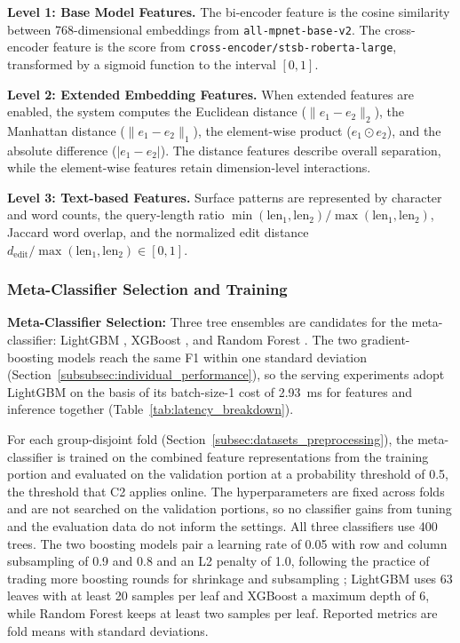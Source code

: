 \documentclass[authoryear,preprint,review,12pt]{elsarticle}
\begin{document}
\textbf{Level 1: Base Model Features.}
The bi-encoder feature is the cosine similarity between 768-dimensional embeddings from \texttt{all-mpnet-base-v2}. The cross-encoder feature is the score from \texttt{cross-encoder/stsb-roberta-large}, transformed by a sigmoid function to the interval $[0,1]$.

\textbf{Level 2: Extended Embedding Features.}
When extended features are enabled, the system computes the Euclidean distance ($\lVert e_1-e_2\rVert_2$), the Manhattan distance ($\lVert e_1-e_2\rVert_1$), the element-wise product ($e_1\odot e_2$), and the absolute difference ($|e_1-e_2|$). The distance features describe overall separation, while the element-wise features retain dimension-level interactions.

\textbf{Level 3: Text-based Features.}
Surface patterns are represented by character and word counts, the query-length ratio $\min(\mathrm{len}_1,\mathrm{len}_2)/\max(\mathrm{len}_1,\mathrm{len}_2)$, Jaccard word overlap, and the normalized edit distance $d_{\mathrm{edit}}/\max(\mathrm{len}_1,\mathrm{len}_2)\in[0,1]$.


\subsubsection{Meta-Classifier Selection and Training}
\label{subsubsec:meta_classifier}
\textbf{Meta-Classifier Selection:}
Three tree ensembles are candidates for the meta-classifier: LightGBM \citep{ke2017lightgbm}, XGBoost \citep{chen2016xgboost}, and Random Forest \citep{breiman2001random}. The two gradient-boosting models reach the same F1 within one standard deviation (Section~\ref{subsubsec:individual_performance}), so the serving experiments adopt LightGBM on the basis of its batch-size-1 cost of 2.93~ms for features and inference together (Table~\ref{tab:latency_breakdown}).

For each group-disjoint fold (Section~\ref{subsec:datasets_preprocessing}), the meta-classifier is trained on the combined feature representations from the training portion and evaluated on the validation portion at a probability threshold of 0.5, the threshold that C2 applies online. The hyperparameters are fixed across folds and are not searched on the validation portions, so no classifier gains from tuning and the evaluation data do not inform the settings. All three classifiers use 400 trees. The two boosting models pair a learning rate of 0.05 with row and column subsampling of 0.9 and 0.8 and an L2 penalty of 1.0, following the practice of trading more boosting rounds for shrinkage and subsampling \citep{friedman2001greedy, friedman2002stochastic}; LightGBM uses 63 leaves with at least 20 samples per leaf and XGBoost a maximum depth of 6, while Random Forest keeps at least two samples per leaf. Reported metrics are fold means with standard deviations.
\end{document}
